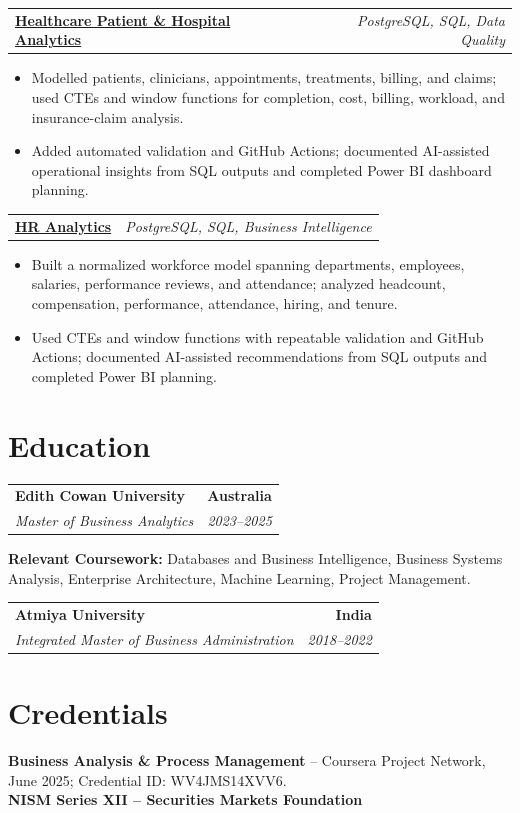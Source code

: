 \documentclass[letterpaper,10pt]{article}
\makeatletter
\newcommand{\role}[4]{%
  \begin{tabularx}{\textwidth}{@{}Xr@{}}
    \textbf{#1} & \textbf{#2} \\
    \textit{#3} & \textit{#4}
  \end{tabularx}\vspace{-1pt}
}
\newcommand{\project}[2]{%
  \begin{tabularx}{\textwidth}{@{}Xr@{}}
    \textbf{#1} & \textit{#2}
  \end{tabularx}\vspace{-1pt}
}
\makeatother
\begin{document}
\project{\href{https://github.com/jainalimehta/Healthcare-Analytics}{Healthcare Patient \& Hospital Analytics}}{PostgreSQL, SQL, Data Quality}
\begin{itemize}
  \item Modelled patients, clinicians, appointments, treatments, billing, and claims; used CTEs and window functions for completion, cost, billing, workload, and insurance-claim analysis.
  \item Added automated validation and GitHub Actions; documented AI-assisted operational insights from SQL outputs and completed Power BI dashboard planning.
\end{itemize}
\vspace{1pt}

\project{\href{https://github.com/jainalimehta/HR-Analytics}{HR Analytics}}{PostgreSQL, SQL, Business Intelligence}
\begin{itemize}
  \item Built a normalized workforce model spanning departments, employees, salaries, performance reviews, and attendance; analyzed headcount, compensation, performance, attendance, hiring, and tenure.
  \item Used CTEs and window functions with repeatable validation and GitHub Actions; documented AI-assisted recommendations from SQL outputs and completed Power BI planning.
\end{itemize}

\section{Education}
\role{Edith Cowan University}{Australia}{Master of Business Analytics}{2023--2025}
\small\textbf{Relevant Coursework:} Databases and Business Intelligence, Business Systems Analysis, Enterprise Architecture, Machine Learning, Project Management.\\[2pt]
\role{Atmiya University}{India}{Integrated Master of Business Administration}{2018--2022}

\section{Credentials}
\small\textbf{Business Analysis \& Process Management} -- Coursera Project Network, June 2025; Credential ID: WV4JMS14XVV6.\\[-0.2pt]
\small\textbf{NISM Series XII -- Securities Markets Foundation}
\end{document}
